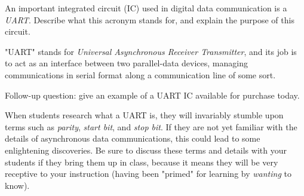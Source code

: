 

An important integrated circuit (IC) used in digital data communication is a {\it UART}.  Describe what this acronym stands for, and explain the purpose of this circuit.







"UART" stands for {\it Universal Asynchronous Receiver Transmitter}, and its job is to act as an interface between two parallel-data devices, managing communications in serial format along a communication line of some sort.

\vskip 10pt

Follow-up question: give an example of a UART IC available for purchase today.







When students research what a UART is, they will invariably stumble upon terms such as {\it parity}, {\it start bit}, and {\it stop bit}.  If they are not yet familiar with the details of asynchronous data communications, this could lead to some enlightening discoveries.  Be sure to discuss these terms and details with your students if they bring them up in class, because it means they will be very receptive to your instruction (having been "primed" for learning by {\it wanting} to know).




